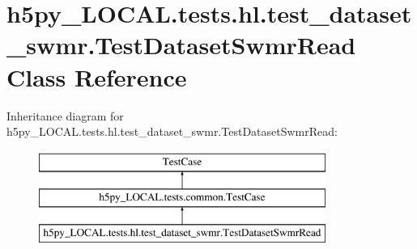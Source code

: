 \hypertarget{classh5py__LOCAL_1_1tests_1_1hl_1_1test__dataset__swmr_1_1TestDatasetSwmrRead}{}\section{h5py\+\_\+\+L\+O\+C\+A\+L.\+tests.\+hl.\+test\+\_\+dataset\+\_\+swmr.\+Test\+Dataset\+Swmr\+Read Class Reference}
\label{classh5py__LOCAL_1_1tests_1_1hl_1_1test__dataset__swmr_1_1TestDatasetSwmrRead}
Inheritance diagram for h5py\+\_\+\+L\+O\+C\+A\+L.\+tests.\+hl.\+test\+\_\+dataset\+\_\+swmr.\+Test\+Dataset\+Swmr\+Read\+:\begin{figure}[H]
\begin{center}
\leavevmode
\includegraphics[height=3.000000cm]{classh5py__LOCAL_1_1tests_1_1hl_1_1test__dataset__swmr_1_1TestDatasetSwmrRead}
\end{center}
\end{figure}
